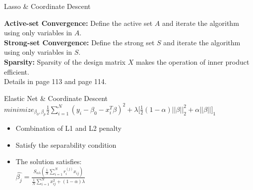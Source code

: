 \documentclass{beamer}
\begin{document}
\begin{frame}{Lasso \& Coordinate Descent }

\textbf{Active-set Convergence:} Define the
active set $A$ and iterate the algorithm using only  variables in $A$.\\
\vspace*{3mm}
\textbf{Strong-set Convergence:}  Define the strong set $S$ and iterate the algorithm using only variables in $S$.\\
\vspace*{3mm}
\textbf{Sparsity:} Sparsity of the design matrix $X$ makes the operation of inner product efficient.\\
\vspace*{3mm}
Details in page 113 and page 114. 

\end{frame}

\begin{frame}{Elastic Net \& Coordinate Descent}
\(minimize_{\beta_0,\beta_p}\frac{1}{2}\sum_{i=1}^{N}(y_{i}-\beta_{0}-x_i^{T}\beta)^2+\lambda \big[\frac{1}{2}(1-\alpha)\lvert\lvert\beta\rvert\rvert_2^2 + \alpha\lvert\lvert\beta \rvert\rvert\big]_1\)
\vspace*{4mm}
\begin{itemize}
    \item Combination of L1 and L2 penalty 
   \vspace*{3mm}
    \item Satisfy the separability condition
    \vspace*{3mm}
    \item The solution satisfies:\\
    \vspace*{3mm}
    \(\hat{\beta_j}=\frac{S_{\alpha\lambda}(\frac{1}{N}\sum_{i=1}^{N}r_i^{(j)} x_{ij} )}{\frac{1}{N}\sum_{i=1}^{N}x_{ij}^2+(1-\alpha)\lambda}\)\\
\end{itemize}



\end{frame}
\end{document}
